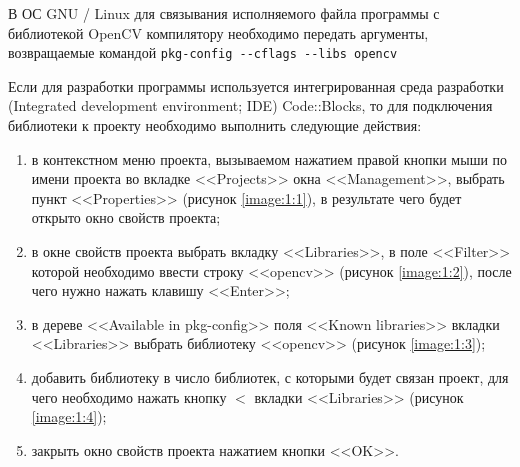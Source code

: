 
В ОС GNU / Linux для связывания исполняемого файла программы с библиотекой OpenCV компилятору необходимо передать аргументы, возвращаемые командой \linebreak \verb|pkg-config --cflags --libs opencv|

Если для разработки программы используется интегрированная среда разработки \linebreak (Integrated development environment; IDE) Code::Blocks, то для подключения библиотеки к проекту необходимо выполнить следующие действия:

\begin{enumerate}

	\item в контекстном меню проекта, вызываемом нажатием правой кнопки мыши по имени проекта во вкладке <<Projects>> окна <<Management>>, выбрать пункт <<Properties>> (рисунок \ref{image:1:1}), в результате чего будет открыто окно свойств проекта;
	\item в окне свойств проекта выбрать вкладку <<Libraries>>, в поле <<Filter>> которой необходимо ввести строку <<opencv>> (рисунок \ref{image:1:2}), после чего нужно нажать клавишу <<Enter>>;
	\item в дереве <<Available in pkg-config>> поля <<Known libraries>> вкладки <<Libraries>> выбрать библиотеку <<opencv>> (рисунок \ref{image:1:3});
	\item добавить библиотеку в число библиотек, с которыми будет связан проект, для чего необходимо нажать кнопку $<$ вкладки <<Libraries>> (рисунок \ref{image:1:4});
	\item закрыть окно свойств проекта нажатием кнопки <<OK>>.

\end{enumerate}

\begin{landscape}
\end{landscape}

